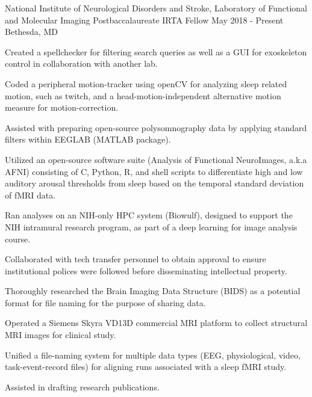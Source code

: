 

\begin{cventries}
 \cventry
 {National Institute of Neurological Disorders and Stroke, Laboratory of Functional and Molecular Imaging}
 {Postbaccalaureate IRTA Fellow}
 {May 2018 - Present}
 {Bethesda, MD}
 	{
		\begin{cvitems}
        	\item {Created a spellchecker for filtering search queries as well as a GUI for exoskeleton control in collaboration with another lab.}
        	\item {Coded a peripheral motion-tracker using openCV for analyzing sleep related motion, such as twitch, and a head-motion-independent alternative motion measure for motion-correction.}
        	\item {Assisted with preparing open-source polysomnography data by applying standard filters within EEGLAB (MATLAB package).}
        	\item {Utilized an open-source software suite (Analysis of Functional NeuroImages, a.k.a AFNI) consisting of C, Python, R, and shell scripts to differentiate high and low auditory arousal thresholds from sleep based on the temporal standard deviation of fMRI data.}
        	\item {Ran analyses on an NIH-only HPC system (Biowulf), designed to support the NIH intramural research program, as part of a deep learning for image analysis course.}
        	\item {Collaborated with tech transfer personnel to obtain approval to ensure institutional polices were followed before disseminating intellectual property.}
        	\item {Thoroughly researched the Brain Imaging Data Structure (BIDS) as a potential format for file naming for the purpose of sharing data.}
        	\item {Operated a Siemens Skyra VD13D commercial MRI platform to collect structural MRI images for clinical study.}
        	\item {Unified a file-naming system for multiple data types (EEG, physiological, video, task-event-record files) for aligning runs associated with a sleep fMRI study.}
        	\item {Assisted in drafting research publications.}
        \end{cvitems}
 	}
 

\end{cventries}
